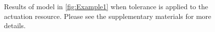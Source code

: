 \begin{figure}[h]

\caption{Results of model in \cref{fig:Example1} when tolerance is applied
to the actuation  resource. Please see the supplementary
materials for more details.}
\end{figure}

